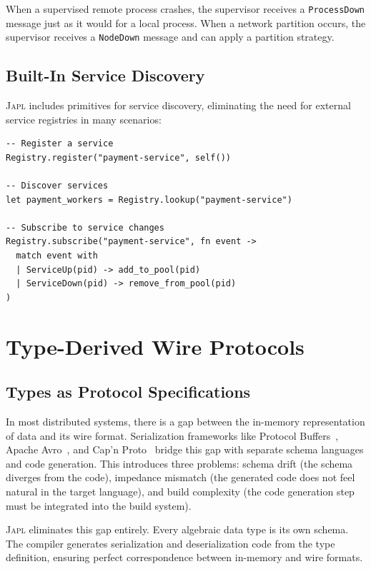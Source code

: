 \documentclass[11pt,a4paper]{article}
\newcommand{\japl}{\textsc{Japl}}
\begin{document}
When a supervised remote process crashes, the supervisor receives a
\texttt{ProcessDown} message just as it would for a local process. When a
network partition occurs, the supervisor receives a \texttt{NodeDown}
message and can apply a partition strategy.

\subsection{Built-In Service Discovery}

\japl{} includes primitives for service discovery, eliminating the need for
external service registries in many scenarios:

\begin{lstlisting}
-- Register a service
Registry.register("payment-service", self())

-- Discover services
let payment_workers = Registry.lookup("payment-service")

-- Subscribe to service changes
Registry.subscribe("payment-service", fn event ->
  match event with
  | ServiceUp(pid) -> add_to_pool(pid)
  | ServiceDown(pid) -> remove_from_pool(pid)
)
\end{lstlisting}


\section{Type-Derived Wire Protocols}
\label{sec:wire-protocols}

\subsection{Types as Protocol Specifications}

In most distributed systems, there is a gap between the in-memory
representation of data and its wire format. Serialization frameworks like
Protocol Buffers~\citep{protobuf2008}, Apache Avro~\citep{avro2009}, and
Cap'n Proto~\citep{capnproto2013} bridge this gap with separate schema
languages and code generation. This introduces three problems: schema drift
(the schema diverges from the code), impedance mismatch (the generated code
does not feel natural in the target language), and build complexity (the
code generation step must be integrated into the build system).

\japl{} eliminates this gap entirely. Every algebraic data type is its own
schema. The compiler generates serialization and deserialization code from
the type definition, ensuring perfect correspondence between in-memory and
wire formats.
\end{document}
